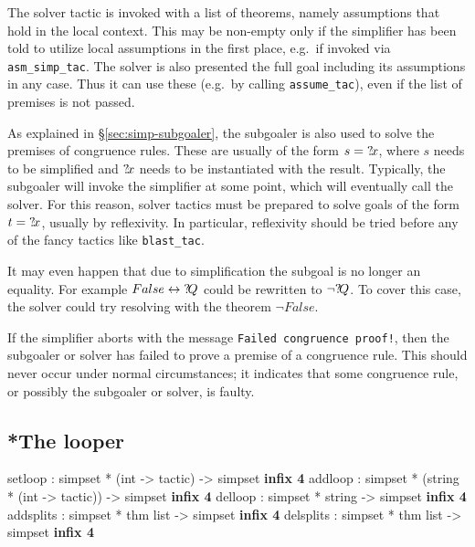 \medskip

 The solver tactic is invoked
with a list of theorems, namely assumptions that hold in the local
context.  This may be non-empty only if the simplifier has been told
to utilize local assumptions in the first place, e.g.\ if invoked via
\texttt{asm_simp_tac}.  The solver is also presented the full goal
including its assumptions in any case.  Thus it can use these (e.g.\ 
by calling \texttt{assume_tac}), even if the list of premises is not
passed.

\medskip

As explained in \S\ref{sec:simp-subgoaler}, the subgoaler is also used
to solve the premises of congruence rules.  These are usually of the
form $s = {?\!x}$, where $s$ needs to be simplified and ${?\!x}$
needs to be instantiated with the result.  Typically, the subgoaler
will invoke the simplifier at some point, which will eventually call
the solver.  For this reason, solver tactics must be prepared to solve
goals of the form $t = {?\!x}$, usually by reflexivity.  In
particular, reflexivity should be tried before any of the fancy
tactics like \texttt{blast_tac}.

It may even happen that due to simplification the subgoal is no longer
an equality.  For example $False \leftrightarrow {?\!Q}$ could be rewritten to
$\lnot{?\!Q}$.  To cover this case, the solver could try resolving
with the theorem $\lnot False$.

\medskip

\begin{warn}
  If the simplifier aborts with the message \texttt{Failed congruence
    proof!}, then the subgoaler or solver has failed to prove a
  premise of a congruence rule.  This should never occur under normal
  circumstances; it indicates that some congruence rule, or possibly
  the subgoaler or solver, is faulty.
\end{warn}


\subsection{*The looper}\label{sec:simp-looper}
\begin{ttbox}
setloop   : simpset *           (int -> tactic)  -> simpset \hfill{\bf infix 4}
addloop   : simpset * (string * (int -> tactic)) -> simpset \hfill{\bf infix 4}
delloop   : simpset *  string                    -> simpset \hfill{\bf infix 4}
addsplits : simpset * thm list -> simpset \hfill{\bf infix 4}
delsplits : simpset * thm list -> simpset \hfill{\bf infix 4}
\end{ttbox}

